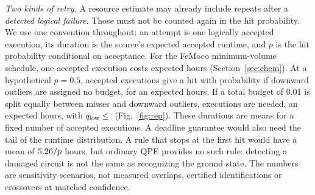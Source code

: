 \documentclass[10pt,a4paper]{article}
\begin{document}
\emph{Two kinds of retry.} A resource estimate may already include repeats after a \emph{detected logical failure}. Those must not be counted again in the hit probability. We use one convention throughout: an attempt is one logically accepted execution, its duration is the source's expected accepted runtime, and $p$ is the hit probability conditional on acceptance. For the FeMoco minimum-volume schedule, one accepted execution costs \femoT{} expected hours (Section~\ref{sec:chem}). At a hypothetical $p=0.5$, \repAttempts{} accepted executions give a hit with probability \repHit{} if downward outliers are assigned no budget, for an expected \repHours{} hours. If a total budget of 0.01 is split equally between misses and downward outliers, \repAttemptsSplit{} executions are needed, an expected \repHoursSplit{} hours, with $q_{\rm low}\le{}$\repQlow{} (Fig.~\ref{fig:rep}). These durations are means for a fixed number of accepted executions. A deadline guarantee would also need the tail of the runtime distribution. A rule that stops at the first hit would have a mean of $5.26/p$ hours, but ordinary QPE provides no such rule: detecting a damaged circuit is not the same as recognizing the ground state. The numbers are sensitivity scenarios, not measured overlaps, certified identifications or crossovers at matched confidence.
\end{document}
